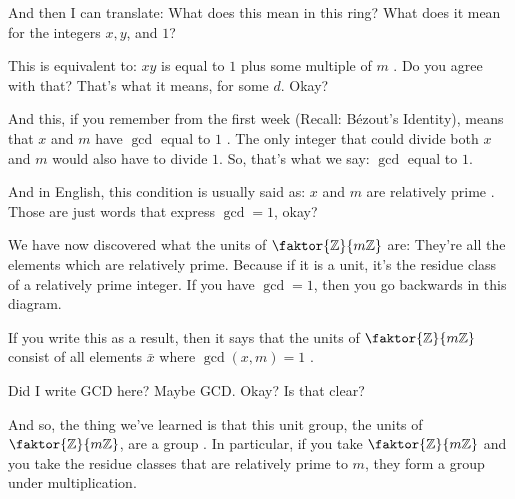 \begin{speech}[00:32:27 - 00:33:32]
And then I can translate: What does this mean in this ring? What does it mean for the integers $x, y$, and $1$?

This is equivalent to: $xy$ is equal to $1$ plus some multiple of $m$ . Do you agree with that? That's what it means, for some $d$. Okay?

And this, if you remember from the first week (Recall: Bézout's Identity), means that $x$ and $m$ have $\operatorname{gcd}$ equal to $1$ . The only integer that could divide both $x$ and $m$ would also have to divide $1$. So, that's what we say: $\operatorname{gcd}$ equal to $1$.

And in English, this condition is usually said as: $x$ and $m$ are relatively prime . Those are just words that express $\operatorname{gcd} = 1$, okay?
\end{speech}

\begin{speech}[00:33:32 - 00:35:02]
We have now discovered what the units of $\faktor{\mathbb{Z}}{m\mathbb{Z}}$ are: They're all the elements which are relatively prime. Because if it is a unit, it's the residue class of a relatively prime integer. If you have $\operatorname{gcd} = 1$, then you go backwards in this diagram.

If you write this as a result, then it says that the units of $\faktor{\mathbb{Z}}{m\mathbb{Z}}$  consist of all elements $\bar{x}$  where $\operatorname{gcd}(x, m) = 1$ .

Did I write GCD here? Maybe GCD. Okay? Is that clear?

And so, the thing we've learned is that this unit group, the units of $\faktor{\mathbb{Z}}{m\mathbb{Z}}$, are a group . In particular, if you take $\faktor{\mathbb{Z}}{m\mathbb{Z}}$ and you take the residue classes that are relatively prime to $m$, they form a group under multiplication.
\end{speech}

